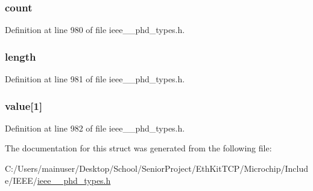 \subsubsection[{count}]{ count}\label{struct___scan_report_per_grouped_list_abf6db060ae8e224764b0f867fb135ecd}


Definition at line 980 of file ieee\+\_\+\_\+phd\+\_\+types.\+h.

\hypertarget{struct___scan_report_per_grouped_list_a3743679e4ff85e3e1b3fc2e59973fbb3}{}
\subsubsection[{length}]{ length}\label{struct___scan_report_per_grouped_list_a3743679e4ff85e3e1b3fc2e59973fbb3}


Definition at line 981 of file ieee\+\_\+\_\+phd\+\_\+types.\+h.

\hypertarget{struct___scan_report_per_grouped_list_ab3e68b5ffaa979f25c6834e357696166}{}
\subsubsection[{value}]{ value\mbox{[}1\mbox{]}}\label{struct___scan_report_per_grouped_list_ab3e68b5ffaa979f25c6834e357696166}


Definition at line 982 of file ieee\+\_\+\_\+phd\+\_\+types.\+h.



The documentation for this struct was generated from the following file\+:\begin{DoxyCompactItemize}
\item 
C\+:/\+Users/mainuser/\+Desktop/\+School/\+Senior\+Project/\+Eth\+Kit\+T\+C\+P/\+Microchip/\+Include/\+I\+E\+E\+E/\hyperlink{ieee__11073__phd__types_8h}{ieee\+\_\+\_\+phd\+\_\+types.\+h}\end{DoxyCompactItemize}
